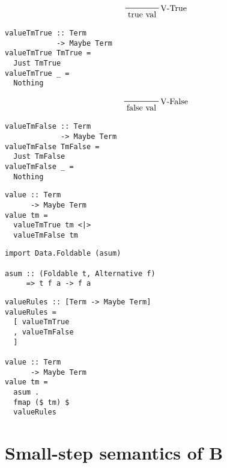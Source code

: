 \documentclass{beamer}
\begin{document}
\begin{frame}[fragile]
  \begin{displaymath}
    \prftree[r]{V-True}{\text{true val}}
  \end{displaymath}
 \begin{verbatim}
valueTmTrue :: Term 
            -> Maybe Term
valueTmTrue TmTrue = 
  Just TmTrue
valueTmTrue _ = 
  Nothing
 \end{verbatim}
\end{frame}

\begin{frame}[fragile]
  \begin{displaymath}
    \prftree[r]{V-False}{\text{false val}}
  \end{displaymath}
 \begin{verbatim}
valueTmFalse :: Term 
             -> Maybe Term
valueTmFalse TmFalse = 
  Just TmFalse
valueTmFalse _ = 
  Nothing
 \end{verbatim}
\end{frame}

\begin{frame}[fragile]
 \begin{verbatim}
value :: Term 
      -> Maybe Term
value tm =
  valueTmTrue tm <|>
  valueTmFalse tm
 \end{verbatim}
\end{frame}

\begin{frame}[fragile]
 \begin{verbatim}
import Data.Foldable (asum)

asum :: (Foldable t, Alternative f) 
     => t f a -> f a
 \end{verbatim}
\end{frame}

\begin{frame}[fragile]
 \begin{verbatim}
valueRules :: [Term -> Maybe Term]
valueRules =
  [ valueTmTrue
  , valueTmFalse
  ]

value :: Term 
      -> Maybe Term
value tm =
  asum .
  fmap ($ tm) $
  valueRules
 \end{verbatim}
\end{frame}

\section{Small-step semantics of B}
\end{document}
